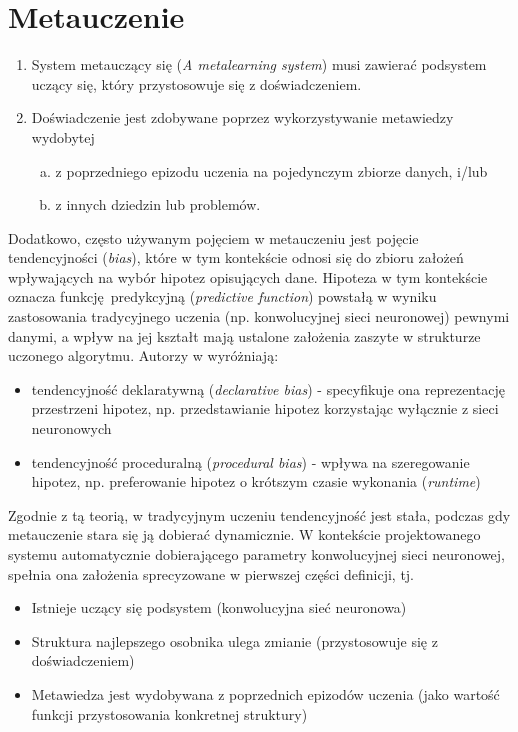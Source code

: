 \section{Metauczenie}
\begin{enumerate}
	\item System metauczący się (\textit{A metalearning system}) musi zawierać podsystem uczący się, który przystosowuje się z doświadczeniem.
	\item Doświadczenie jest zdobywane poprzez wykorzystywanie metawiedzy wydobytej
	\begin{enumerate}[a)]
		\item z poprzedniego epizodu uczenia na pojedynczym zbiorze danych, i/lub
		\item z innych dziedzin lub problemów.
	\end{enumerate}
\end{enumerate}
Dodatkowo, często używanym pojęciem w metauczeniu jest pojęcie tendencyjności (\textit{bias}), które w tym kontekście odnosi się do zbioru założeń wpływających na wybór hipotez opisujących dane. \cite{Lemke2015}
Hipoteza w tym kontekście oznacza funkcję predykcyjną (\textit{predictive function}) powstałą w wyniku zastosowania tradycyjnego uczenia (np. konwolucyjnej sieci neuronowej) pewnymi danymi, a wpływ na jej kształt mają ustalone założenia zaszyte w strukturze uczonego algorytmu. \cite[s.2]{Brazdil2009}
Autorzy w \cite{Brazdil2009} wyróżniają:
\begin{itemize}
	\item tendencyjność deklaratywną (\textit{declarative bias}) - specyfikuje ona reprezentację przestrzeni hipotez, np. przedstawianie hipotez korzystając wyłącznie z sieci neuronowych
	\item tendencyjność proceduralną (\textit{procedural bias}) - wpływa na szeregowanie hipotez, np. preferowanie hipotez o krótszym czasie wykonania (\textit{runtime})
\end{itemize}
Zgodnie z tą teorią, w tradycyjnym uczeniu tendencyjność jest stała, podczas gdy metauczenie stara się ją dobierać dynamicznie. \cite{Lemke2015}
W kontekście projektowanego systemu automatycznie dobierającego parametry konwolucyjnej sieci neuronowej, spełnia ona założenia sprecyzowane w pierwszej części definicji, tj.
\begin{itemize}
	\item Istnieje uczący się podsystem (konwolucyjna sieć neuronowa)
	\item Struktura najlepszego osobnika ulega zmianie (przystosowuje się z doświadczeniem)
	\item Metawiedza jest wydobywana z poprzednich epizodów uczenia (jako wartość funkcji przystosowania konkretnej struktury)
\end{itemize}
